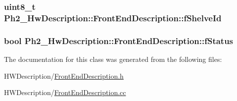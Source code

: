 \hypertarget{class_ph2___hw_description_1_1_front_end_description_a7ce5e0acdcb5647bb94f09ec480e8155}{
\subsubsection[{f\-Shelve\-Id}]{\setlength{\rightskip}{0pt plus 5cm}uint8\-\_\-t Ph2\-\_\-\-Hw\-Description\-::\-Front\-End\-Description\-::f\-Shelve\-Id\hspace{0.3cm}{\ttfamily [protected]}}}\label{class_ph2___hw_description_1_1_front_end_description_a7ce5e0acdcb5647bb94f09ec480e8155}
\hypertarget{class_ph2___hw_description_1_1_front_end_description_a719dce1ef5c6656fd71ae91f6f404053}{
\subsubsection[{f\-Status}]{\setlength{\rightskip}{0pt plus 5cm}bool Ph2\-\_\-\-Hw\-Description\-::\-Front\-End\-Description\-::f\-Status\hspace{0.3cm}{\ttfamily [protected]}}}\label{class_ph2___hw_description_1_1_front_end_description_a719dce1ef5c6656fd71ae91f6f404053}


The documentation for this class was generated from the following files\-:\begin{DoxyCompactItemize}
\item 
H\-W\-Description/\hyperlink{_front_end_description_8h}{Front\-End\-Description.\-h}\item 
H\-W\-Description/\hyperlink{_front_end_description_8cc}{Front\-End\-Description.\-cc}\end{DoxyCompactItemize}
